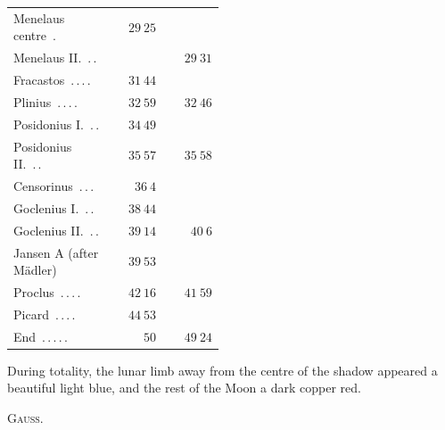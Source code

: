 \begin{center}
\begin{tabular}{@{}p{0.47\linewidth}|r|r@{}}
Menelaus centre\ \mbox{.} & $29\ 25$ & \\
Menelaus II.\ \mbox{.\,.} &  & $29\ 31$\\
Fracastos\ \mbox{.\,.\,.\,.} & $31\ 44$ & \\
Plinius\ \mbox{.\,.\,.\,.} & $32\ 59$ & $32\ 46$\\
Posidonius I.\ \mbox{.\,.} & $34\ 49$ & \\
Posidonius II.\ \mbox{.\,.} & $35\ 57$ & $35\ 58$\\
Censorinus\ \mbox{.\,.\,.} & $36\ 4$ & \\
Goclenius I.\ \mbox{.\,.} & $38\ 44$ & \\
Goclenius II.\ \mbox{.\,.} & $39\ 14$ & $40\ 6$\\
Jansen A (after Mädler) & $39\ 53$ & \\
Proclus\ \mbox{.\,.\,.\,.} & $42\ 16$ & $41\ 59$\\
Picard\ \mbox{.\,.\,.\,.} & $44\ 53$ & \\
End\ \mbox{.\,.\,.\,.\,.} & $50$ & $49\ 24$\\
\end{tabular}\endgroup\end{center}

During totality, the lunar limb away from the centre of the shadow appeared a beautiful light blue, and the rest of the Moon a dark copper red.
\begin{flushright}\textsc{Gauss.}\end{flushright}
